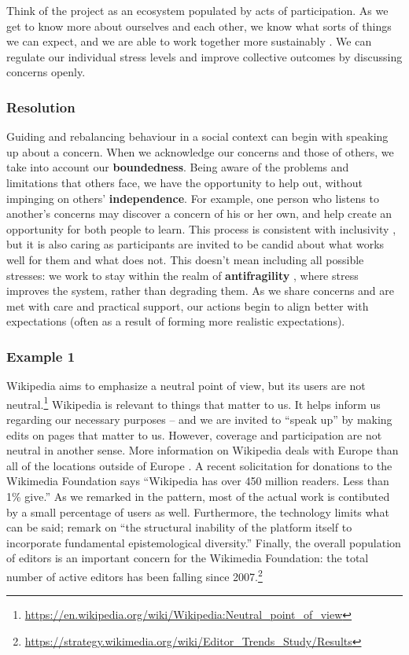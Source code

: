 Think of the project as an ecosystem populated by acts of participation.  As we get to know more about ourselves and each other, we know what sorts of things we can expect, and we are able to work together more sustainably \cite{ostrom2010revising}.
%
We can regulate our individual stress levels and improve collective outcomes by discussing concerns openly.

\subsubsection*{Resolution}

Guiding and rebalancing behaviour in a social context can begin with speaking up about a concern.  When we acknowledge our concerns and those of others, we take into account our \textbf{boundedness}.  Being aware of the problems and limitations that others face, we have the opportunity to help out, without impinging on others' \textbf{independence}.  For example, one person who listens to another's concerns may discover a concern of his or her own, and help create an opportunity for both people to learn.  This process is  consistent with inclusivity \cite{garrison2013toward}, but it is also caring as participants are invited to be candid about what works well for them and what does not.  This doesn't mean including all possible stresses: we work to stay within the realm of \textbf{antifragility} \cite{taleb2012antifragile}, where stress improves the system, rather than degrading them. 
%
As we share concerns and are met with care and practical support, our actions begin to align better with expectations (often as a result of forming more realistic expectations). 

\subsubsection*{Example 1}
Wikipedia aims to emphasize a neutral point of view, but its users are
not neutral.\footnote{\url{https://en.wikipedia.org/wiki/Wikipedia:Neutral_point_of_view}}
Wikipedia is relevant to things that matter to us.  It
helps inform us regarding our necessary purposes -- and we are invited
to ``speak up'' by making edits on pages that matter to us.  However,
coverage and participation are not neutral in another sense.
More information on Wikipedia deals with Europe than
all of the locations outside of Europe \cite{graham2014uneven}.
A recent solicitation for donations to the Wikimedia Foundation
says ``Wikipedia has over 450 million readers.  Less than 1\% give.''
%
As we remarked in the  pattern, most of the
actual work is contibuted by a small percentage of users as well.
%
Furthermore, the technology limits what can be said; 
\cite{graham2014uneven} remark on
``the structural inability of the platform itself to incorporate fundamental epistemological diversity.''
%
Finally, the overall population of editors is an important concern for
the Wikimedia Foundation: the total number of active editors has been
falling since
2007.\footnote{\url{https://strategy.wikimedia.org/wiki/Editor_Trends_Study/Results}}

